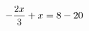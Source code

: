 \documentclass[preview]{standalone}
\begin{document}
\begin{align*}
\special{dvisvgm:raw <g id='unique000'>}- \frac{2 x}{3} + x = 8 - 20\special{dvisvgm:raw </g>}
\end{align*}
\end{document}
